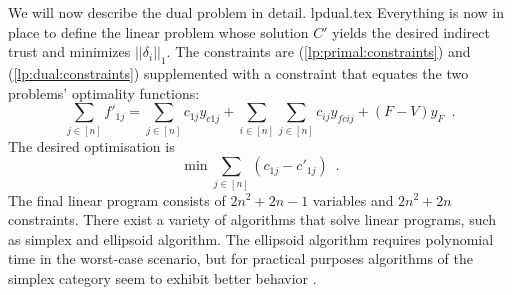   We will now describe the dual problem in detail.
  {lpdual.tex}
  Everything is now in place to define the linear problem whose solution $C'$ yields the desired indirect trust and minimizes
  $||\delta_i||_1$. The constraints are (\ref{lp:primal:constraints}) and (\ref{lp:dual:constraints}) supplemented with a
  constraint that equates the two problems' optimality functions:
  \begin{equation*}
    \sum\limits_{j \in \left[n\right]}f'_{1j} = \sum\limits_{j \in \left[n\right]}c_{1j}y_{c1j} +
    \sum\limits_{i \in \left[n\right]}\sum\limits_{j \in \left[n\right]}c_{ij}y_{fcij} + \left(F - V\right)y_F \enspace.
  \end{equation*}
  The desired optimisation is
  \begin{equation*}
    \min{\sum\limits_{j \in \left[n\right]}\left(c_{1j} - c'_{1j}\right)} \enspace.
  \end{equation*}
  The final linear program consists of $2n^2 + 2n - 1$ variables and $2n^2 + 2n$ constraints. There exist a variety of
  algorithms that solve linear programs, such as simplex and ellipsoid algorithm. The ellipsoid algorithm requires polynomial
  time in the worst-case scenario, but for practical purposes algorithms of the simplex category seem to exhibit better
  behavior \cite{it}.
